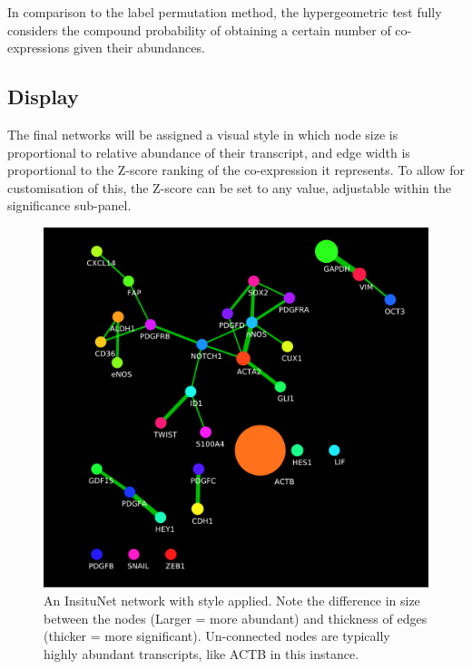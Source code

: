 \documentclass[a4paper,12pt]{article}
\begin{document}
In comparison to the label permutation method, the hypergeometric test fully considers the compound probability of obtaining a certain number of co-expressions given their abundances.


\subsection{Display}
The final networks will be assigned a visual style in which node size is proportional to relative abundance of their transcript, and edge width is proportional to the Z-score ranking of the co-expression it represents. To allow for customisation of this, the Z-score can be set to any value, adjustable within the significance sub-panel.

\begin{figure}[htb]
	\caption{An InsituNet network with style applied. Note the difference in size between the nodes (Larger = more abundant) and thickness of edges (thicker = more significant). Un-connected nodes are typically highly abundant transcripts, like ACTB in this instance.}
	\label{fig:net}
	\centering
	\includegraphics[width=\textwidth]{net}
\end{figure}
\end{document}
